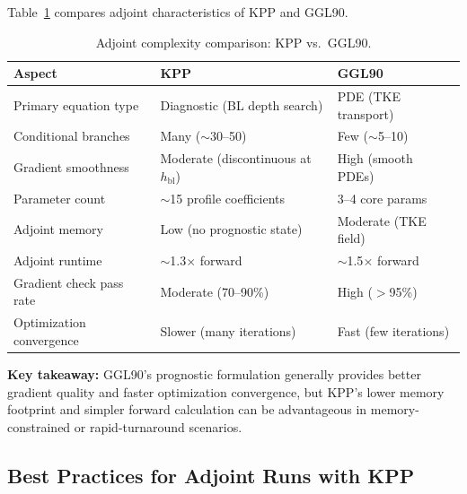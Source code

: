 \documentclass[12pt,letterpaper]{article}
\begin{document}
Table~\ref{tab:kpp_ggl90_adjoint_comparison} compares adjoint characteristics
of KPP and GGL90.

\begin{table}[h!]
\centering
\caption{Adjoint complexity comparison: KPP vs.\ GGL90.}
\label{tab:kpp_ggl90_adjoint_comparison}
\begin{tabular}{@{}lll@{}}
\toprule
\textbf{Aspect} & \textbf{KPP} & \textbf{GGL90} \\
\midrule
Primary equation type & Diagnostic (BL depth search) & PDE (TKE transport) \\
Conditional branches & Many ($\sim$30--50) & Few ($\sim$5--10) \\
Gradient smoothness & Moderate (discontinuous at $h_{\text{bl}}$) & High (smooth PDEs) \\
Parameter count & $\sim$15 profile coefficients & 3--4 core params \\
Adjoint memory & Low (no prognostic state) & Moderate (TKE field) \\
Adjoint runtime & $\sim$1.3$\times$ forward & $\sim$1.5$\times$ forward \\
Gradient check pass rate & Moderate (70--90\%) & High ($>$95\%) \\
Optimization convergence & Slower (many iterations) & Fast (few iterations) \\
\bottomrule
\end{tabular}
\end{table}

\textbf{Key takeaway:} GGL90's prognostic formulation generally provides better
gradient quality and faster optimization convergence, but KPP's lower memory
footprint and simpler forward calculation can be advantageous in memory-constrained
or rapid-turnaround scenarios.

\subsection{Best Practices for Adjoint Runs with KPP}
\end{document}
